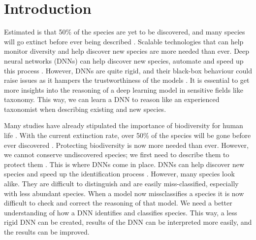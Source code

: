 \documentclass[a4paper, 12pt, oneside]{book} %
\begin{document}
\renewcommand{\thesection}{\arabic{section}}
\section{Introduction}

Estimated is that 50\% of the species are yet to be discovered, and many species will go extinct before ever being described \autocite{lees_species_2015}.
Scalable technologies that can help monitor diversity and help discover new species are more needed than ever.
Deep neural networks (DNNs) can help discover new species, automate and speed up this process \autocite{van_horn_inaturalist_2018}.
However, DNNs are quite rigid, and their black-box behaviour could raise issues as it hampers the trustworthiness of the models \autocite{carvalho_machine_2019}.
It is essential to get more insights into the reasoning of a deep learning model in sensitive fields like taxonomy.
This way, we can learn a DNN to reason like an experienced taxonomist when describing existing and new species.

Many studies have already stipulated the importance of biodiversity for human life \autocite{pimentel_economic_1997, gowdy_value_1997, raffaelli_links_2010, joppa_biodiversity_2011, pimm_how_2018}.
With the current extinction rate, over 50\% of the species will be gone before ever discovered \autocite{lees_species_2015}.
Protecting biodiversity is now more needed than ever.
However, we cannot conserve undiscovered species; we first need to describe them to protect them \autocite{joppa_biodiversity_2011}.
This is where DNNs come in place.
DNNs can help discover new species and speed up the identification process \autocite{van_horn_inaturalist_2018}.
However, many species look alike.
They are difficult to distinguish and are easily miss-classified, especially with less abundant species.
When a model now missclassifies a species it is now difficult to check and correct the reasoning of that model.
We need a better understanding of how a DNN identifies and classifies species. 
This way, a less rigid DNN can be created, results of the DNN can be interpreted more easily, and the results can be improved.
\end{document}
